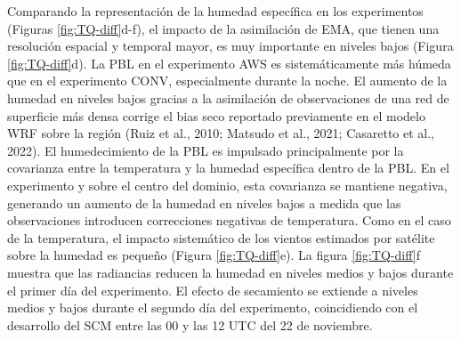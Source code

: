 \documentclass[12pt,oneside]{reedthesis}
\begin{document}
Comparando la representación de la humedad específica en los experimentos (Figuras \ref{fig:TQ-diff}d-f), el impacto de la asimilación de EMA, que tienen una resolución espacial y temporal mayor, es muy importante en niveles bajos (Figura \ref{fig:TQ-diff}d). La PBL en el experimento AWS es sistemáticamente más húmeda que en el experimento CONV, especialmente durante la noche. El aumento de la humedad en niveles bajos gracias a la asimilación de observaciones de una red de superficie más densa corrige el bias seco reportado previamente en el modelo WRF sobre la región (Ruiz et al., 2010; Matsudo et al., 2021; Casaretto et al., 2022). El humedecimiento de la PBL es impulsado principalmente por la covarianza entre la temperatura y la humedad específica dentro de la PBL. En el experimento y sobre el centro del dominio, esta covarianza se mantiene negativa, generando un aumento de la humedad en niveles bajos a medida que las observaciones introducen correcciones negativas de temperatura. Como en el caso de la temperatura, el impacto sistemático de los vientos estimados por satélite sobre la humedad es pequeño (Figura \ref{fig:TQ-diff}e). La figura \ref{fig:TQ-diff}f muestra que las radiancias reducen la humedad en niveles medios y bajos durante el primer día del experimento. El efecto de secamiento se extiende a niveles medios y bajos durante el segundo día del experimento, coincidiendo con el desarrollo del SCM entre las 00 y las 12 UTC del 22 de noviembre.
\end{document}

